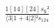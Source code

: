 \documentclass[varwidth, border=5pt]{standalone}
\begin{document}
\begin{my}
$\begin{gathered}
\scriptscriptstyle\frac{1[14][24]s_{𝟓}²}{⟨3|1+4|2]²s_{124}}
\end{gathered}$
\end{my}
\end{document}
